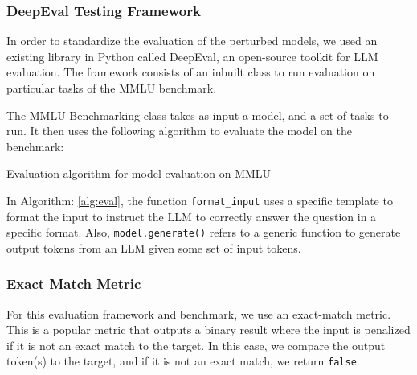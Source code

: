 \subsubsection{DeepEval Testing Framework}
In order to standardize the evaluation of the perturbed models, we used an existing library in Python called DeepEval, an open-source toolkit for LLM evaluation. The framework consists of an inbuilt class to run evaluation on particular tasks of the MMLU benchmark. 

The MMLU Benchmarking class takes as input a model, and a set of tasks to run. It then uses the following algorithm to evaluate the model on the benchmark:

\begin{algorithm}
    \caption{Evaluation algorithm for model evaluation on MMLU}
    \label{alg:eval}
    \SetAlgoLined
\end{algorithm}
In Algorithm: \ref{alg:eval}, the function \verb|format_input| uses a specific template to format the input to instruct the LLM to correctly answer the question in a specific format. Also, \verb|model.generate()| refers to a generic function to generate output tokens from an LLM given some set of input tokens. 

\subsubsection{Exact Match Metric}
For this evaluation framework and benchmark, we use an exact-match metric. This is a popular metric that outputs a binary result where the input is penalized if it is not an exact match to the target. In this case, we compare the output token(s) to the target, and if it is not an exact match, we return \verb|false|.

